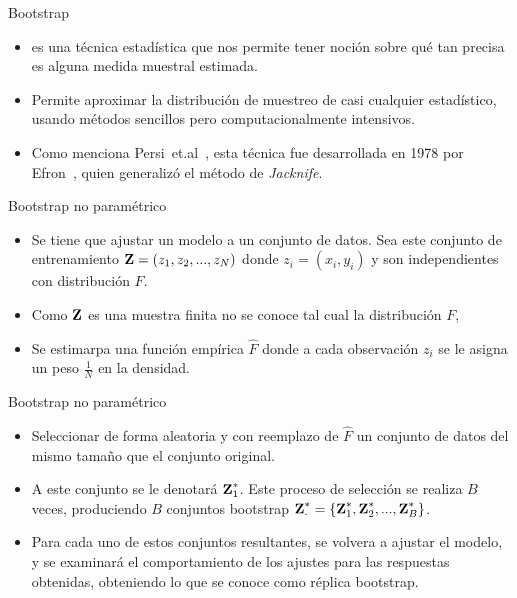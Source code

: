 \begin{frame}{Bootstrap}
  \begin{itemize} 
    \itemsep1em
    \item 
     es una técnica estadística que nos permite tener noción sobre qué tan precisa es alguna medida muestral estimada. 

    \item Permite aproximar la distribución de muestreo de casi cualquier estadístico, usando métodos sencillos pero computacionalmente intensivos. 

    \item Como menciona Persi~et.al~\cite{Diaconis1983}, esta técnica fue desarrollada en 1978 por Efron~\cite{Efron1978}, quien generalizó el método de \textit{Jacknife}.

  \end{itemize}
\end{frame}        

\begin{frame}{Bootstrap no paramétrico}
  \begin{itemize} 
    \itemsep1em
      \item
      Se tiene que ajustar un modelo a un conjunto de datos. Sea este conjunto de entrenamiento $\textbf{Z} = (z_1, z_2, ..., z_N)$ donde $z_i = (x_i, y_i)$ y son independientes con distribución $F$. 

      \item
      Como $\textbf{Z}$ es una muestra finita no se conoce tal cual la distribución $F$, 

      \item
      Se estimarpa una función empírica $\hat F$ donde a cada observación $z_i$ se le asigna un peso $\frac{1}{N}$ en la densidad.
    \end{itemize}
\end{frame}        

\begin{frame}{Bootstrap no paramétrico}
  \begin{itemize} 
    \itemsep1em
      \item
      Seleccionar de forma aleatoria y con reemplazo de $\hat{F}$ un conjunto de datos del mismo tamaño que el conjunto original. 

      \item A este conjunto se le denotará $\textbf{Z}^{*}_1$. Este proceso de selección se realiza $B$ veces, produciendo $B$ conjuntos bootstrap $\textbf{Z}^{*}_{\cdot} = \lbrace \textbf{Z}^{*}_1, \textbf{Z}^{*}_2, ..., \textbf{Z}^{*}_B \rbrace$. 

      \item Para cada uno de estos conjuntos resultantes, se volvera a ajustar el modelo, y se examinará el comportamiento de los ajustes para las respuestas obtenidas, obteniendo lo que se conoce como réplica bootstrap.
    \end{itemize}
\end{frame}        

